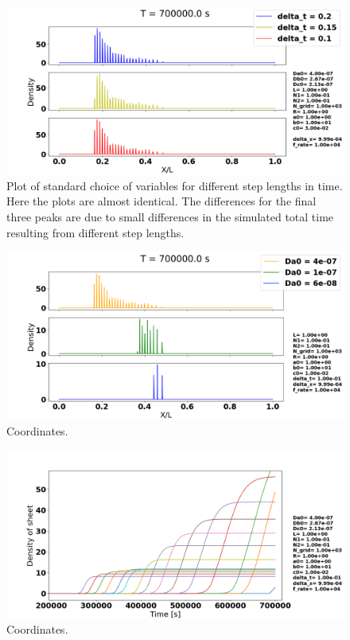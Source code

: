\documentclass[1p]{elsarticle}        	%
\begin{document}
\begin{figure}
	\centering
	\includegraphics[width=\linewidth]{../figures/deltaT.png}
	\caption{Plot of standard choice of variables for different step lengths in time. Here the plots are almost identical. The differences for the final three peaks are due to small differences in the simulated total time resulting from different step lengths.}
	\label{fig:coords}
\end{figure}

\begin{figure}
	\centering
	\includegraphics[width=\linewidth]{../figures/Da0_same_ratio.png}
	\caption{Coordinates.}
	\label{fig:coords}
\end{figure}

\begin{figure}
	\centering
	\includegraphics[width=\linewidth]{../figures/peak_growth.png}
	\caption{Coordinates.}
	\label{fig:coords}
\end{figure}
\end{document}
